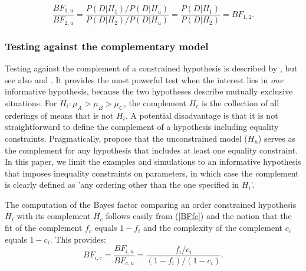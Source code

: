 \documentclass[11pt,reqno]{article}
\begin{document}
\begin{equation*}
  \frac{BF_{1,u}}{BF_{2,u}} = \frac{P(D|H_{1}) / P(D|H_u)}{P(D|H_{2}) / P(D|H_u)} = \frac{P(D|H_{1})}{P(D|H_{2})} = BF_{1,2}.
\end{equation*}


\subsubsection{Testing against the complementary model}
Testing against the complement of a constrained hypothesis is described by \textcite{hoijtink_informative_2012}, but see also \textcite{vandeun_testing_2009} and \textcite{vanrossum_hypothesis_2013}. It provides the most powerful test when the interest lies in \emph{one} informative hypothesis, because the two hypotheses describe mutually exclusive situations. For $H_i: \mu_A > \mu_B > \mu_C$, the complement $H_c$ is the collection of all orderings of means that is not $H_i$.
A potential disadvantage is that it is not straightforward to define the complement of a hypothesis including equality constraints. Pragmatically, \textcite{gu_approximated_2018} propose that the unconstrained model ($H_u$) serves as the complement for any hypothesis that includes at least one equality constraint. In this paper, we limit the examples and simulations to an informative hypothesis that imposes inequality constraints on parameters, in which case the complement is clearly defined as 'any ordering other than the one specified in $H_i$'.

The computation of the Bayes factor comparing an order constrained hypothesis $H_i$ with its complement $H_c$ follows easily from (\ref{BFfc}) and the notion that the fit of the complement $f_c$ equals $1-f_i$ and the complexity of the complement $c_c$ equals $1-c_i$. This provides:
\begin{equation}\label{BFic}
  BF_{i,c} = \frac{BF_{i,u}}{BF_{c,u}} = \frac{f_i / c_i}{(1-f_i)/(1-c_i)}.
\end{equation}
\end{document}

